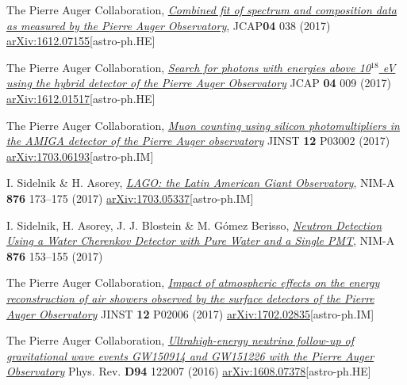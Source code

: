\begin{etaremune}
\item {}The Pierre Auger Collaboration, \href{https://doi.org/10.1088/1475-7516/2017/04/038}{\emph{Combined fit of spectrum and composition data as measured by the Pierre Auger Observatory}}, JCAP{\bf{04}} 038 (2017) \href{http://arxiv.org/abs/1612.07155}{arXiv:1612.07155}[astro-ph.HE]

\item {}The Pierre Auger Collaboration, \href{https://doi.org/10.1088/1475-7516/2017/04/009}{\emph{Search for photons with energies above 10$^{18}$ eV using the hybrid detector of the Pierre Auger Observatory}} JCAP {\bf{04}} 009 (2017) \href{http://arxiv.org/abs/1612.01517}{arXiv:1612.01517}[astro-ph.HE]

\item {}The Pierre Auger Collaboration, \href{https://doi.org/10.1088/1748-0221/12/03/P03002}{\emph{Muon counting using silicon photomultipliers in the AMIGA detector of the Pierre Auger observatory}} JINST {\bf 12} P03002 (2017) \href{http://arxiv.org/abs/1703.06193}{arXiv:1703.06193}[astro-ph.IM]

\item {}I. Sidelnik \& H. Asorey, \href{https://doi.org/10.1016/j.nima.2017.02.069}{\emph{LAGO: the Latin American Giant Observatory}}, NIM-A {\bf{876}} 173--175 (2017) \href{http://arxiv.org/abs/1703.05337}{arXiv:1703.05337}[astro-ph.IM]

\item {} I. Sidelnik, H. Asorey, J. J. Blostein \& M. Gómez Berisso, \href{https://doi.org/10.1016/j.nima.2017.02.048}{\emph{Neutron Detection Using a Water Cherenkov Detector with Pure Water and a Single PMT}}, NIM-A {\bf{876}} 153--155 (2017)

\item {}The Pierre Auger Collaboration, \href{https://doi.org/10.1088/1748-0221/12/02/P02006}{\emph{Impact of atmospheric effects on the energy reconstruction of air showers observed by the surface detectors of the Pierre Auger Observatory}} JINST {\bf 12} P02006 (2017) \href{http://arxiv.org/abs/1702.02835}{arXiv:1702.02835}[astro-ph.IM]

\item {}The Pierre Auger Collaboration, \href{https://doi.org/10.1103/PhysRevD.94.122007}{\emph{Ultrahigh-energy neutrino follow-up of gravitational wave events GW150914 and GW151226 with the Pierre Auger Observatory}} Phys. Rev. {\bf D94} 122007 (2016) \href{http://arxiv.org/abs/1608.07378}{arXiv:1608.07378}[astro-ph.HE]


\end{etaremune}
